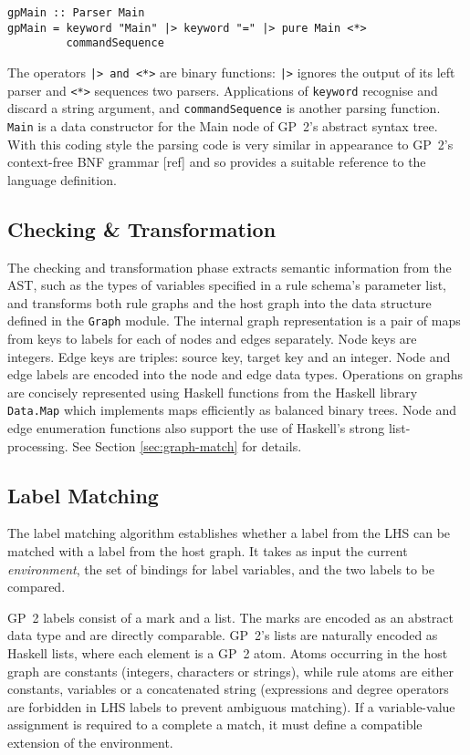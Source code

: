 \begin{verbatim}
gpMain :: Parser Main
gpMain = keyword "Main" |> keyword "=" |> pure Main <*> 
         commandSequence
\end{verbatim}

The operators \texttt{|> and <*>} are binary functions: \texttt{|>} ignores the output of its left parser and \texttt{<*>} sequences two parsers. Applications of \texttt{keyword} recognise and discard a string argument, and \texttt{commandSequence} is another parsing function. \texttt{Main} is a data constructor for the Main node of GP~2's abstract syntax tree. With this coding style the parsing code is very similar in appearance to GP~2's context-free BNF grammar [ref] and so provides a suitable reference to the language definition.

\subsection{Checking \& Transformation}

The checking and transformation phase extracts semantic information from the AST, such as the types of variables specified in a rule schema's parameter list, and transforms both rule graphs and the host graph into the data structure defined in the \texttt{Graph} module. The internal graph representation is a pair of maps from keys to labels for each of nodes and edges separately. Node keys are integers. Edge keys are triples: source key, target key and an integer. Node and edge labels are encoded into the node and edge data types. Operations on graphs are concisely represented using Haskell functions from the Haskell library \texttt{Data.Map} which implements maps efficiently as balanced binary trees. Node and edge enumeration functions also support the use of Haskell's strong list-processing. See Section \ref{sec:graph-match} for details.

\subsection{Label Matching}
The label matching algorithm establishes whether a label from the LHS can be matched with a label from the host graph. It takes as input the current \textit{environment}, the set of bindings for label variables, and the two labels to be compared. 

GP~2 labels consist of a mark and a list. The marks are encoded as an abstract data type and are directly comparable. GP~2's lists are naturally encoded as Haskell lists, where each element is a GP~2 atom. Atoms occurring in the host graph are constants (integers, characters or strings), while rule atoms are either constants, variables or a concatenated string (expressions and degree operators are forbidden in LHS labels to prevent ambiguous matching). If a variable-value assignment is required to a complete a match, it must define a compatible extension of the environment.

